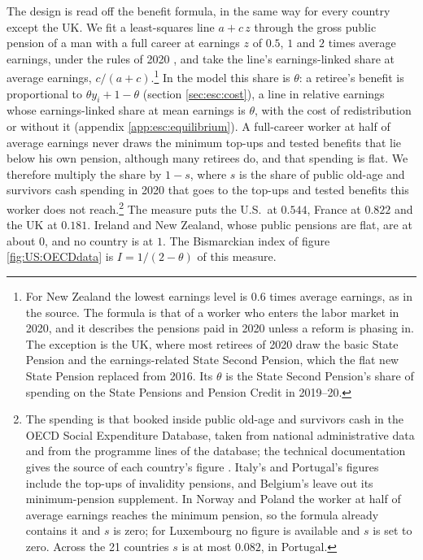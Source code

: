 The design is read off the benefit formula, in the same way for every country except the UK. We fit a least-squares line $a + c\,z$ through the gross public pension of a man with a full career at earnings $z$ of $0.5$, $1$ and $2$ times average earnings, under the rules of 2020 \parencite[table 4.2]{OECDpen}, and take the line's earnings-linked share at average earnings, $c/(a+c)$.\footnote{For New Zealand the lowest earnings level is $0.6$ times average earnings, as in the source. The formula is that of a worker who enters the labor market in 2020, and it describes the pensions paid in 2020 unless a reform is phasing in. The exception is the UK, where most retirees of 2020 draw the basic State Pension and the earnings-related State Second Pension, which the flat new State Pension replaced from 2016. Its $\theta$ is the State Second Pension's share of spending on the State Pensions and Pension Credit in 2019--20.} In the model this share is $\theta$: a retiree's benefit is proportional to $\theta y_i + 1-\theta$ (section \ref{sec:esc:cost}), a line in relative earnings whose earnings-linked share at mean earnings is $\theta$, with the cost of redistribution or without it (appendix \ref{app:esc:equilibrium}). A full-career worker at half of average earnings never draws the minimum top-ups and tested benefits that lie below his own pension, although many retirees do, and that spending is flat. We therefore multiply the share by $1-s$, where $s$ is the share of public old-age and survivors cash spending in 2020 that goes to the top-ups and tested benefits this worker does not reach.\footnote{The spending is that booked inside public old-age and survivors cash in the OECD Social Expenditure Database, taken from national administrative data and from the programme lines of the database; the technical documentation gives the source of each country's figure \parencite{BergGE26doc}. Italy's and Portugal's figures include the top-ups of invalidity pensions, and Belgium's leave out its minimum-pension supplement. In Norway and Poland the worker at half of average earnings reaches the minimum pension, so the formula already contains it and $s$ is zero; for Luxembourg no figure is available and $s$ is set to zero. Across the 21 countries $s$ is at most $0.082$, in Portugal.} The measure puts the U.S.\ at $0.544$, France at $0.822$ and the UK at $0.181$. Ireland and New Zealand, whose public pensions are flat, are at about $0$, and no country is at $1$. The Bismarckian index of figure \ref{fig:US:OECDdata} is $I = 1/(2-\theta)$ of this measure.

